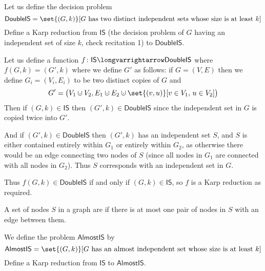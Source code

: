 \documentclass[10pt]{article}
\let\longto=\longvarrightarrow
\begin{document}


\bigskip

\def\dubis{\mathsf{DoubleIS}}
\def\is{\mathsf{IS}}
\begin{exercise*}

    Let us define the decision problem
    \[ \dubis = \set{(G,k)}[\text{$G$ has two distinct independent sets whose size is at least $k$}] \]
    Define a Karp reduction from $\is$ (the decision problem of $G$ having an independent set of size $k$, check recitation 1) to $\dubis$.

\end{exercise*}

Let us define a function $f\colon\is\longto\dubis$ where $f(G,k)=(G',k)$ where we define $G'$ as follows:
if $G=(V,E)$ then we define $G_i=(V_i,E_i)$ to be two distinct copies of $G$ and
\[ G' = \bigl(V_1\dcup V_2, E_1\dcup E_2\dcup\set{(v,u)}[v\in V_1,\,u\in V_2]\bigr) \]
Then if $(G,k)\in\is$ then $(G',k)\in\dubis$ since the independent set in $G$ is copied twice into $G'$.

And if $(G',k)\in\dubis$ then $(G',k)$ has an independent set $S$, and $S$ is either contained entirely within $G_1$ or entirely within $G_2$, as otherwise there would be an edge connecting two nodes
of $S$ (since all nodes in $G_1$ are connected with all nodes in $G_2$).
Thus $S$ corresponds with an independent set in $G$.

Thus $f(G,k)\in\dubis$ if and only if $(G,k)\in\is$, so $f$ is a Karp reduction as required.

\begin{defn}

    A set of nodes $S$ in a graph are  if there is at most one pair of nodes in $S$ with an edge between them.

\end{defn}

\def\almostIS{\mathsf{AlmostIS}}
\begin{exercise*}

    We define the problem $\almostIS$ by
    \[ \almostIS = \set{(G,k)}[\text{$G$ has an almost independent set whose size is at least $k$}] \]
    Define a Karp reduction from $\is$ to $\almostIS$.

\end{exercise*}
\end{document}
